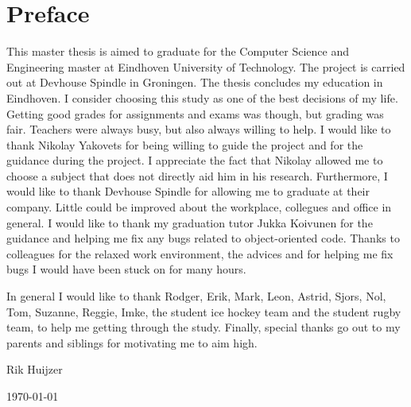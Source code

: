 \chapter*{Preface}
\label{ch:preface}

This master thesis is aimed to graduate for the Computer Science and Engineering master at Eindhoven University of Technology.
The project is carried out at Devhouse Spindle in Groningen.
The thesis concludes my education in Eindhoven.
I consider choosing this study as one of the best decisions of my life.
Getting good grades for assignments and exams was though, but grading was fair.
Teachers were always busy, but also always willing to help.
I would like to thank Nikolay Yakovets for being willing to guide the project and for the guidance during the project.
I appreciate the fact that Nikolay allowed me to choose a subject that does not directly aid him in his research.
Furthermore, I would like to thank Devhouse Spindle for allowing me to graduate at their company.
Little could be improved about the workplace, collegues and office in general.
I would like to thank my graduation tutor Jukka Koivunen for the guidance and helping me fix any bugs related to object-oriented code.
Thanks to colleagues for the relaxed work environment, the advices and for helping me fix bugs I would have been stuck on for many hours.

In general I would like to thank Rodger, Erik, Mark, Leon, Astrid, Sjors, Nol, Tom, Suzanne, Reggie, Imke, the student ice hockey team and the student rugby team, to help me getting through the study.
Finally, special thanks go out to my parents and siblings for motivating me to aim high.


\vspace*{5mm}
Rik Huijzer

\today